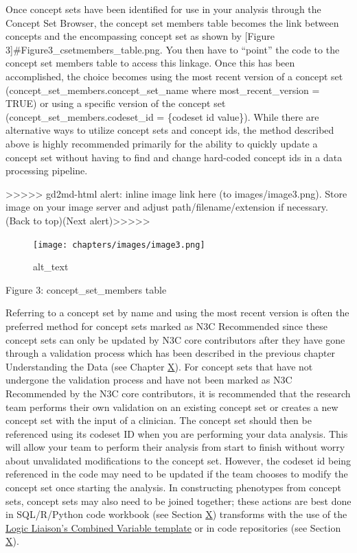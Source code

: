 \documentclass[
  letterpaper,
  DIV=11,
  numbers=noendperiod]{scrreprt}
\begin{document}
Once concept sets have been identified for use in your analysis through
the Concept Set Browser, the concept set members table becomes the link
between concepts and the encompassing concept set as shown by {[}Figure
3{]}\#Figure3\_csetmembers\_table.png. You then have to ``point'' the
code to the concept set members table to access this linkage. Once this
has been accomplished, the choice becomes using the most recent version
of a concept set (concept\_set\_members.concept\_set\_name where
most\_recent\_version = TRUE) or using a specific version of the concept
set (concept\_set\_members.codeset\_id = \{codeset id value\}). While
there are alternative ways to utilize concept sets and concept ids, the
method described above is highly recommended primarily for the ability
to quickly update a concept set without having to find and change
hard-coded concept ids in a data processing pipeline.

{\textgreater\textgreater\textgreater\textgreater\textgreater{}
gd2md-html alert: inline image link here (to images/image3.png). Store
image on your image server and adjust path/filename/extension if
necessary. }(Back to top)(Next
alert){\textgreater\textgreater\textgreater\textgreater\textgreater{} }

\begin{figure}

{\centering \texttt{[image: chapters/images/image3.png]}

}

\caption{alt\_text}

\end{figure}

Figure 3: concept\_set\_members table

Referring to a concept set by name and using the most recent version is
often the preferred method for concept sets marked as N3C Recommended
since these concept sets can only be updated by N3C core contributors
after they have gone through a validation process which has been
described in the previous chapter Understanding the Data (see Chapter
\protect\hyperlink{Understanding-the-Data}{X}). For concept sets that
have not undergone the validation process and have not been marked as
N3C Recommended by the N3C core contributors, it is recommended that the
research team performs their own validation on an existing concept set
or creates a new concept set with the input of a clinician. The concept
set should then be referenced using its codeset ID when you are
performing your data analysis. This will allow your team to perform
their analysis from start to finish without worry about unvalidated
modifications to the concept set. However, the codeset id being
referenced in the code may need to be updated if the team chooses to
modify the concept set once starting the analysis. In constructing
phenotypes from concept sets, concept sets may also need to be joined
together; these actions are best done in SQL/R/Python code workbook (see
Section \protect\hyperlink{Code-Workbook}{X}) transforms with the use of
the
\href{https://unite.nih.gov/workspace/module/view/latest/ri.workshop.main.module.3ab34203-d7f3-482e-adbd-f4113bfd1a2b?id=KO-DE908D4\&view=focus}{Logic
Liaison's Combined Variable template} or in code repositories (see
Section \protect\hyperlink{Code-Repositories}{X}).
\end{document}
